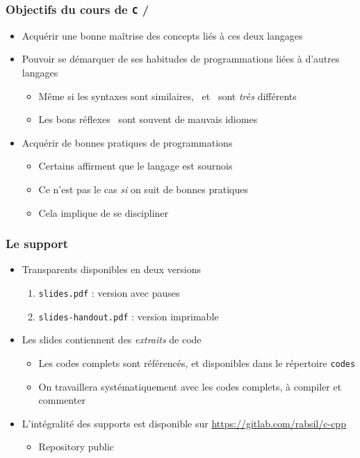 \begin{frame}
\frametitle{Objectifs du cours de \texttt{C} / \cpp}
\begin{itemize}[<+->]
\item Acquérir une bonne maîtrise des concepts liés à ces deux langages
\item Pouvoir se démarquer de ses habitudes de programmations liées à d'autres langages
	\begin{itemize}
	\item Même si les syntaxes sont similaires, \cpp\ et \java\ sont \emph{très} différents
	\item Les bons réflexes \java\ sont souvent de mauvais idiomes \cpp
	\end{itemize}
\item Acquérir de bonnes pratiques de programmations
	\begin{itemize}
	\item Certains affirment que le langage est sournois
	\item Ce n'est pas le cas \emph{si} on suit de bonnes pratiques
	\item Cela implique de se discipliner
	\end{itemize}
\end{itemize}
\end{frame}

\begin{frame}
\frametitle{Le support}
\begin{itemize}[<+->]
\item Transparents disponibles en deux versions
	\begin{enumerate}
	\item \texttt{slides.pdf} : version avec pauses
	\item \texttt{slides-handout.pdf} : version imprimable
	\end{enumerate}
\item Les slides contiennent des \emph{extraits} de code
	\begin{itemize}
	\item Les codes complets sont référencés, et disponibles dans le répertoire \texttt{codes}
	\item On travaillera systématiquement avec les codes complets, à compiler et commenter
	\end{itemize}
\item L'intégralité des supports est disponible sur \url{https://gitlab.com/rabsil/c-cpp}
	\begin{itemize}
	\item Repository public
	\end{itemize}
\end{itemize}
\end{frame}

